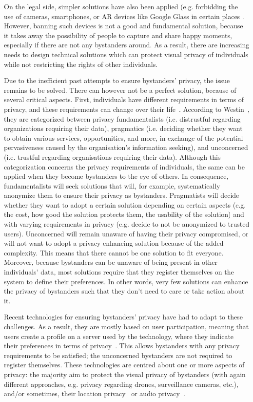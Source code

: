 \documentclass[conference]{IEEEtran}
\begin{document}
On the legal side, simpler solutions have also been applied (e.g. forbidding the use of cameras, smartphones, or \ac{AR} devices like Google Glass in certain places \cite{shu2016cardea}. However, banning such devices is not a good and fundamental solution, because it takes away the possibility of people to capture and share happy moments, especially if there are not any bystanders around. As a result, there are increasing needs to design technical solutions which can protect visual privacy of individuals while not restricting the rights of other individuals. 

Due to the inefficient past attempts to ensure bystanders' privacy, the issue remains to be solved. There can however not be a perfect solution, because of several critical aspects. First, individuals have different requirements in terms of privacy, and these requirements can change over their life~\cite{shu2016cardea}. According to Westin~\cite{langheinrich2009privacy}, they are categorized between privacy fundamentalists (i.e. distrustful regarding organizations requiring their data), pragmatics (i.e. deciding whether they want to obtain various services, opportunities, and more, in exchange of the potential pervasiveness caused by the organisation's information seeking), and unconcerned (i.e. trustful regarding organisations requiring their data). Although this categorization concerns the privacy requirements of individuals, the same can be applied when they become bystanders to the eye of others. In consequence, fundamentalists will seek solutions that will, for example, systematically anonymize them to ensure their privacy as bystanders. Pragmatists will decide whether they want to adopt a certain solution depending on certain aspects (e.g. the cost, how good the solution protects them, the usability of the solution) and with varying requirements in privacy (e.g. decide to not be anonymized to trusted users). Unconcerned will remain unaware of having their privacy compromised, or will not want to adopt a privacy enhancing solution because of the added complexity. This means that there cannot be one solution to fit everyone. Moreover, because bystanders can be unaware of being present in other individuals' data, most solutions require that they register themselves on the system to define their preferences. In other words, very few solutions can enhance the privacy of bystanders such that they don't need to care or take action about it.

Recent technologies for ensuring bystanders' privacy have had to adapt to these challenges. As a result, they are mostly based on user participation, meaning that users create a profile on a server used by the technology, where they indicate their preferences in terms of privacy~\cite{chinomi2008PriSurv, shu2016cardea}. This allows bystanders with any privacy requirements to be satisfied; the unconcerned bystanders are not required to register themselves. These technologies are centred about one or more aspects of privacy: the majority aim to protect the visual privacy of bystanders (with again different approaches, e.g. privacy regarding drones, surveillance cameras, etc.), and/or sometimes, their location privacy~\cite{olteanu2018consensual} or audio privacy~\cite{larson2011accurate}. 
\end{document}
